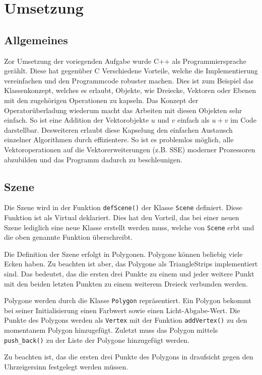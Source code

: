 \documentclass[final,a4paper,11pt,notitlepage,halfparskip]{scrreprt}
\begin{document}
\chapter{Umsetzung}
\section{Allgemeines}
Zor Umsetzung der voriegenden Aufgabe wurde C++ als Programmiersprache gerählt.
Diese hat gegenüber C Verschiedene Vorteile, welche die Implementierung
vereinfachen und den Programmcode robuster machen. Dies ist zum Beispiel das
Klassenkonzept, welches es erlaubt, Objekte, wie Dreiecke, Vektoren oder Ebenen
mit den zugehörigen Operationen zu kapseln. Das Konzept der Operatorüberladung
wiederum macht das Arbeiten mit diesen Objekten sehr einfach. So ist eine
Addition der Vektorobjekte $u$ und $v$ einfach als $u + v$ im Code darstellbar.
Desweiteren erlaubt diese Kapselung den einfachen Austausch einzelner
Algorithmen durch effizientere. So ist es problemlos möglich, alle
Vektoroperationen auf die Vektorerweiterungen (z.B. SSE) moderner Prozessoren 
abzubilden und das Programm dadurch zu beschleunigen.

\section{Szene}
Die Szene wird in der Funktion \texttt{defScene()} der Klasse \texttt{Scene}
definiert. Diese Funktion ist als Virtual deklariert. Dies hat den Vorteil, das
bei einer neuen Szene lediglich eine neue Klasse erstellt werden muss, welche
von \texttt{Scene} erbt und die oben genannte Funktion überschreibt.

Die Definition der Szene erfolgt in Polygonen. Polygone können beliebig viele
Ecken haben. Zu beachten ist aber, das Polygone als TriangleStrips implementiert
sind. Das bedeutet, das die ersten drei Punkte zu einem und jeder weitere Punkt 
mit den beiden letzten Punkten zu einem weiterem Dreieck verbunden werden.

Polygone werden durch die Klasse \texttt{Polygon} repräsentiert. Ein Polygon
bekommt bei seiner Initialisierung einen Farbwert sowie einen Licht-Abgabe-Wert.
Die Punkte des Polygons werden als \texttt{Vertex} mit der Funktion
\texttt{addVertex()} zu den momentanem Polygon hinzugefügt. Zuletzt muss das
Polygon mittels \texttt{push\_back()} zu der Liste der Polygone hinzugefügt
werden.

Zu beachten ist, das die ersten drei Punkte des Polygons in draufsicht gegen den
Uhrzeigersinn festgelegt werden müssen.
\end{document}
